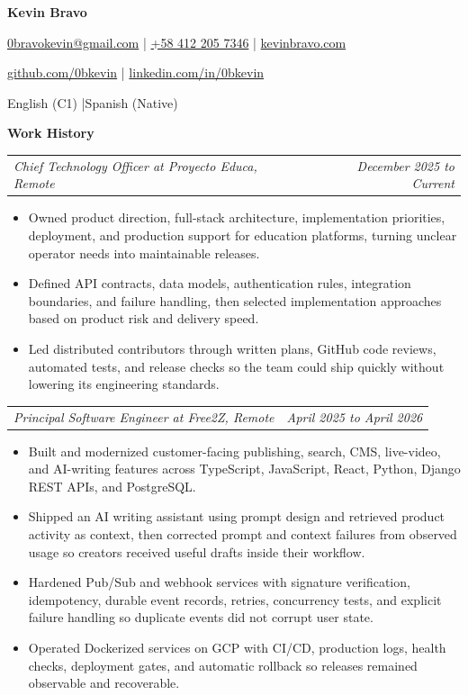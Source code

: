 \documentclass[10pt,letterpaper]{article}
\makeatletter
\newcommand{\bodyfont}{\fontsize{10.5}{15.75}\selectfont}
\newcommand{\contactfont}{\fontsize{12}{15}\selectfont}
\newcommand{\sectiontitle}[1]{%
  \par\vspace{4pt}
  {\bodyfont\textbf{#1}}\par
  \nopagebreak[4]
  \vspace{2pt}
}
\newcommand{\roleline}[2]{%
  \begin{tabularx}{\textwidth}{@{}Xr@{}}
    \bodyfont\textit{#1} & \bodyfont\textit{#2}
  \end{tabularx}
  \nopagebreak[4]
  \vspace{1pt}
}
\makeatother
\begin{document}
\bodyfont
\raggedright

\begin{center}
  {\fontsize{14}{17}\selectfont\textbf{Kevin Bravo}}\par
  \vspace{3pt}
  {\contactfont
    \href{mailto:0bravokevin@gmail.com}{0bravokevin@gmail.com}
    \enspace|\enspace
    \href{tel:+584122057346}{+58 412 205 7346}
    \enspace|\enspace
    \href{https://kevinbravo.com}{kevinbravo.com}
  }\par
  {\contactfont
    \href{https://github.com/0bkevin}{github.com/0bkevin}
    \enspace|\enspace
    \href{https://www.linkedin.com/in/0bkevin/}{linkedin.com/in/0bkevin}
  }\par
  {\contactfont English (C1) \enspace|\enspace Spanish (Native)}
\end{center}

\sectiontitle{Work History}

\roleline{Chief Technology Officer at Proyecto Educa, Remote}{December 2025 to Current}
\begin{itemize}
  \item Owned product direction, full-stack architecture, implementation priorities, deployment, and production support for education platforms, turning unclear operator needs into maintainable releases.
  \item Defined API contracts, data models, authentication rules, integration boundaries, and failure handling, then selected implementation approaches based on product risk and delivery speed.
  \item Led distributed contributors through written plans, GitHub code reviews, automated tests, and release checks so the team could ship quickly without lowering its engineering standards.
\end{itemize}

\vspace{3pt}
\roleline{Principal Software Engineer at Free2Z, Remote}{April 2025 to April 2026}
\begin{itemize}
  \item Built and modernized customer-facing publishing, search, CMS, live-video, and AI-writing features across TypeScript, JavaScript, React, Python, Django REST APIs, and PostgreSQL.
  \item Shipped an AI writing assistant using prompt design and retrieved product activity as context, then corrected prompt and context failures from observed usage so creators received useful drafts inside their workflow.
  \item Hardened Pub/Sub and webhook services with signature verification, idempotency, durable event records, retries, concurrency tests, and explicit failure handling so duplicate events did not corrupt user state.
  \item Operated Dockerized services on GCP with CI/CD, production logs, health checks, deployment gates, and automatic rollback so releases remained observable and recoverable.
\end{itemize}
\end{document}
